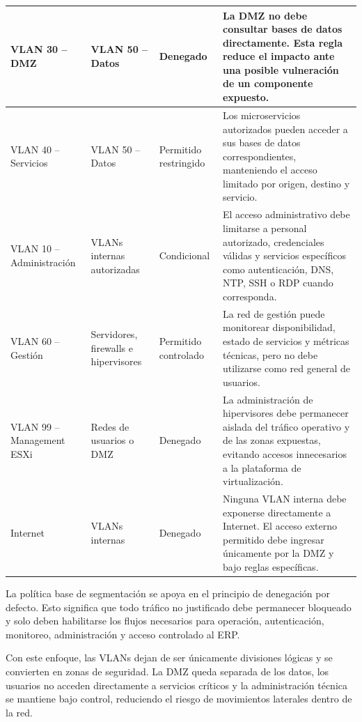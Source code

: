 \documentclass[11pt, a4paper, oneside]{report}
\begin{document}
\begin{xltabular}{\textwidth}{@{}|L{3cm}|L{3cm}|L{2.4cm}|X|@{}}
{\small VLAN 30 -- DMZ} &
{\small VLAN 50 -- Datos} &
{\small Denegado} &
{\small La DMZ no debe consultar bases de datos directamente. Esta regla reduce el impacto ante una posible vulneración de un componente expuesto.} \\ \hline

{\small VLAN 40 -- Servicios} &
{\small VLAN 50 -- Datos} &
{\small Permitido restringido} &
{\small Los microservicios autorizados pueden acceder a sus bases de datos correspondientes, manteniendo el acceso limitado por origen, destino y servicio.} \\ \hline

{\small VLAN 10 -- Administración} &
{\small VLANs internas autorizadas} &
{\small Condicional} &
{\small El acceso administrativo debe limitarse a personal autorizado, credenciales válidas y servicios específicos como autenticación, DNS, NTP, SSH o RDP cuando corresponda.} \\ \hline

{\small VLAN 60 -- Gestión} &
{\small Servidores, firewalls e hipervisores} &
{\small Permitido controlado} &
{\small La red de gestión puede monitorear disponibilidad, estado de servicios y métricas técnicas, pero no debe utilizarse como red general de usuarios.} \\ \hline

{\small VLAN 99 -- Management ESXi} &
{\small Redes de usuarios o DMZ} &
{\small Denegado} &
{\small La administración de hipervisores debe permanecer aislada del tráfico operativo y de las zonas expuestas, evitando accesos innecesarios a la plataforma de virtualización.} \\ \hline

{\small Internet} &
{\small VLANs internas} &
{\small Denegado} &
{\small Ninguna VLAN interna debe exponerse directamente a Internet. El acceso externo permitido debe ingresar únicamente por la DMZ y bajo reglas específicas.} \\ \hline

\end{xltabular}

\normalsize

La política base de segmentación se apoya en el principio de denegación por defecto. Esto significa que todo tráfico no justificado debe permanecer bloqueado y solo deben habilitarse los flujos necesarios para operación, autenticación, monitoreo, administración y acceso controlado al ERP.

Con este enfoque, las VLANs dejan de ser únicamente divisiones lógicas y se convierten en zonas de seguridad. La DMZ queda separada de los datos, los usuarios no acceden directamente a servicios críticos y la administración técnica se mantiene bajo control, reduciendo el riesgo de movimientos laterales dentro de la red.
\end{document}
